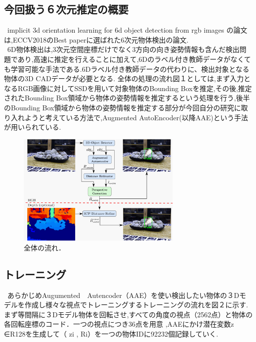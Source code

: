 \documentclass[11pt,a4j,ascmac]{jarticle}
\begin{document}
\subsection{今回扱う６次元推定の概要}
\  implicit 3d orientation learning for 6d object detection from rgb images の論文は,ECCV2018のBest paperに選ばれた6次元物体検出の論文.\\
\ 6D物体検出は,3次元空間座標だけでなく3方向の向き姿勢情報も含んだ検出問題であり,高速に推定を行えることに加えて,6Dのラベル付き教師データがなくても学習可能な手法である.6Dラベル付き教師データの代わりに、検出対象となる物体の3D CADデータが必要となる. 全体の処理の流れ図１としては,まず入力となるRGB画像に対してSSDを用いて対象物体のBounding Boxを推定,その後,推定されたBounding Box領域から物体の姿勢情報を推定するという処理を行う,後半のBounding Box領域から物体の姿勢情報を推定する部分が今回自分の研究に取り入れようと考えている方法で,Augmented AutoEncoder(以降AAE)という手法が用いられている.\\   
      \begin{figure}[htpp]
      \centering
      \includegraphics[width=80mm]{pic1.eps}
      \vspace*{20mm}
      \caption{全体の流れ．}
      \label{fig:2d_pose_estimation}
      \end{figure}

\subsection{トレーニング}

\  あらかじめAugumented　Autencoder（AAE）を使い検出したい物体の３Dモデルを作成し様々な視点でトレーニングするトレーニングの流れを図２に示す.まず等間隔に３Dモデル物体を回転させ,すべての角度の視点（2562点）と物体の各回転座標のコード．一つの視点につき36点を用意 ,AAEにかけ潜在変数z ∈R128を生成して（ zi , Ri）を一つの物体IDに92232個記録していく.\\ \\ \\
\end{document}
